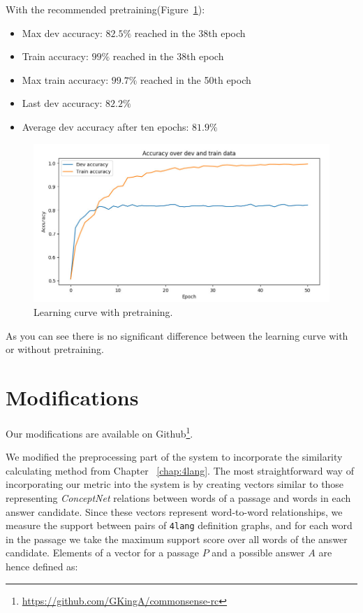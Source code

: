 \begin{minipage}{\linewidth}
With the recommended pretraining(Figure~\ref{fig:learning_curve2}):
\begin{itemize}
	\item Max dev accuracy: $82.5\%$ reached in the 38th epoch
	\item Train accuracy: $99\%$ reached in the 38th epoch
	\item Max train accuracy: $99.7\%$ reached in the 50th epoch
	\item Last dev accuracy: $82.2\%$
	\item Average dev accuracy after ten epochs: $81.9\%$
\end{itemize}
\end{minipage}
\begin{figure}[!htb]
	\centering
	\includegraphics[scale=0.5]{learning_curve2.jpg}
	\caption{Learning curve with pretraining.}
	\label{fig:learning_curve2}
\end{figure}

As you can see there is no significant difference between the learning curve with or without pretraining.

\section{Modifications}
Our modifications are available on Github\footnote{\url{https://github.com/GKingA/commonsense-rc}}.

We modified the preprocessing part of the system to incorporate the similarity calculating method from Chapter ~\ref{chap:4lang}. The most straightforward way of incorporating our metric into the system is by creating vectors similar to those representing \textit{ConceptNet} relations between words of a passage and words in each answer candidate. Since these vectors represent
word-to-word relationships, we measure the support between pairs of \texttt{4lang} definition graphs, and for each word in the passage we take the maximum support score over all words of the answer candidate. Elements of a vector for a passage $P$ and a possible answer $A$ are hence defined as:

